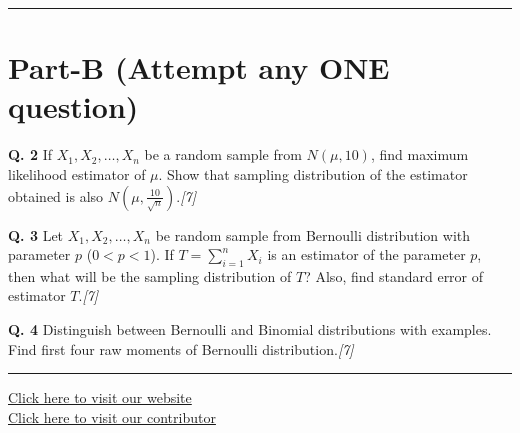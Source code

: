 \documentclass[11pt,a4paper]{article}
\newcommand{\pts}[1]{\hfill   \textit{[#1]}}
\begin{document}
\medskip\rule{\linewidth}{0.2pt}\medskip

\section*{Part-B (Attempt any ONE question)}




\noindent   \textbf{Q. 2} If $X_1, X_2, \dots, X_n$ be a random sample from $N(\mu, 10)$, find maximum likelihood estimator of $\mu$. Show that sampling distribution of the estimator obtained is also $N\left(\mu, \frac{10}{\sqrt{n}}\right)$.\pts{7}

\medskip




\noindent   \textbf{Q. 3} Let $X_1, X_2, \dots, X_n$ be random sample from Bernoulli distribution with parameter $p$ ($0 < p < 1$). If $T = \sum_{i=1}^{n} X_i$ is an estimator of the parameter $p$, then what will be the sampling distribution of $T$? Also, find standard error of estimator $T$.\pts{7}

\medskip




\noindent   \textbf{Q. 4} Distinguish between Bernoulli and Binomial distributions with examples. Find first four raw moments of Bernoulli distribution.\pts{7}

\vfill\rule{\linewidth}{0.4pt}

\begin{center}\small
\href{https://bhu-exam.vercel.app/}{Click here to visit our website}\\[4pt]
\href{https://me-aryan.vercel.app/}{Click here to visit our contributor}
\end{center}
\end{document}
